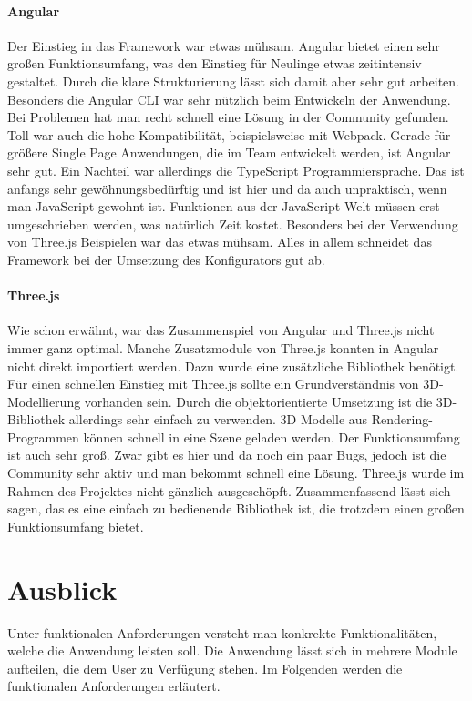 \paragraph{Angular}
Der Einstieg in das Framework war etwas mühsam. Angular bietet einen sehr großen Funktionsumfang, was den Einstieg für Neulinge etwas zeitintensiv gestaltet. Durch die klare Strukturierung lässt sich damit aber sehr gut arbeiten. Besonders die Angular CLI war sehr nützlich beim Entwickeln der Anwendung. Bei Problemen hat man recht schnell eine Lösung in der Community gefunden. Toll war auch die hohe Kompatibilität, beispielsweise mit Webpack. Gerade für größere Single Page Anwendungen, die im Team entwickelt werden, ist Angular sehr gut. Ein Nachteil war allerdings die TypeScript Programmiersprache. Das ist anfangs sehr gewöhnungsbedürftig und ist hier und da auch unpraktisch, wenn man JavaScript gewohnt ist. Funktionen aus der JavaScript-Welt müssen erst umgeschrieben werden, was natürlich Zeit kostet. Besonders bei der Verwendung von Three.js Beispielen war das etwas mühsam. Alles in allem schneidet das Framework bei der Umsetzung des Konfigurators gut ab.
\paragraph{Three.js}
Wie schon erwähnt, war das Zusammenspiel von Angular und Three.js nicht immer ganz optimal. Manche Zusatzmodule von Three.js konnten in Angular nicht direkt importiert werden. Dazu wurde eine zusätzliche Bibliothek benötigt. Für einen schnellen Einstieg mit Three.js sollte ein Grundverständnis von 3D-Modellierung vorhanden sein. Durch die objektorientierte Umsetzung ist die 3D-Bibliothek allerdings sehr einfach zu verwenden. 3D Modelle aus Rendering-Programmen können schnell in eine Szene geladen werden. Der Funktionsumfang ist auch sehr groß. Zwar gibt es hier und da noch ein paar Bugs, jedoch ist die Community sehr aktiv und man bekommt schnell eine Lösung. Three.js wurde im Rahmen des Projektes nicht gänzlich ausgeschöpft. Zusammenfassend lässt sich sagen, das es eine einfach zu bedienende Bibliothek ist, die trotzdem einen großen Funktionsumfang bietet.
\section{Ausblick}
%
Unter funktionalen Anforderungen versteht man konkrekte Funktionalitäten, welche die Anwendung leisten soll. Die Anwendung lässt sich in mehrere Module aufteilen, die dem User zu Verfügung stehen. Im Folgenden werden die funktionalen Anforderungen erläutert.
%
